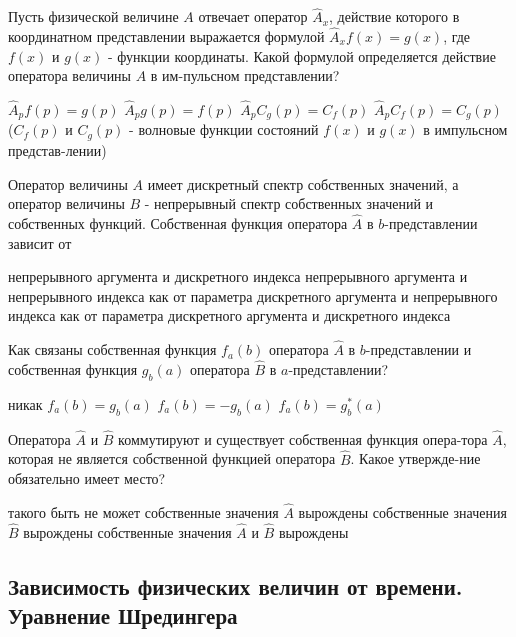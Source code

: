 \documentclass[11pt,a4paper]{exam}
\begin{document}
\begin{questions}
\question Пусть физической величине $A$ отвечает оператор ${\hat A_x}$, действие которого в координатном представлении выражается формулой ${\hat A_x}f(x) = g(x)$, где $f(x)$ и $g(x)$ - функции координаты. Какой формулой определяется действие оператора величины $A$ в им-пульсном представлении?
\begin{choices}
\choice ${\hat A_p}f(p) = g(p)$       
\choice ${\hat A_p}g(p) = f(p)$         
\choice ${\hat A_p}{C_g}(p) = {C_f}(p)$        
\choice ${\hat A_p}{C_f}(p) = {C_g}(p)$
(${C_f}(p)$ и ${C_g}(p)$ - волновые функции состояний $f(x)$ и $g(x)$ в импульсном представ-лении) 
\end{choices}

\question Оператор величины $A$ имеет дискретный спектр собственных значений, а оператор величины $B$ - непрерывный спектр собственных значений и собственных функций. Собственная функция оператора $\hat A$ в $b$-представлении зависит от
\begin{choices}
\choice непрерывного аргумента и дискретного индекса
\choice непрерывного аргумента и непрерывного индекса как от параметра  
\choice дискретного аргумента и непрерывного индекса как от параметра
\choice дискретного аргумента и дискретного индекса
\end{choices}

\question Как связаны собственная функция ${f_a}(b)$ оператора $\hat A$ в $b$-представлении и собственная функция ${g_b}(a)$ оператора $\hat B$ в $a$-представлении?
\begin{choices}
\choice никак     
\choice ${f_a}(b) = {g_b}(a)$    
\choice ${f_a}(b) =  - {g_b}(a)$    
\choice ${f_a}(b) = g_b^*(a)$
\end{choices}

\question Оператора $\hat A$ и $\hat B$ коммутируют и существует собственная функция опера-тора $\hat A$, которая не является собственной функцией оператора $\hat B$. Какое утвержде-ние обязательно имеет место?
\begin{choices}
\choice такого быть не может           
\choice собственные значения $\hat A$ вырождены
\choice собственные значения $\hat B$ вырождены       
\choice собственные значения $\hat A$ и $\hat B$ вырождены
\end{choices}

\end{questions}

\subsection{ Зависимость физических величин от времени. Уравнение Шредингера }
\end{document}
